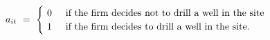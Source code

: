\begin{equation}
    a_{it} \ = \ 
    \begin{cases}
        \ 0 \hspace{0.5cm} \text{if the firm decides not to drill a well in the site} \\
        \ 1 \hspace{0.5cm} \text{if the firm decides to drill a well in the site.}
    \end{cases}
\label{Equation:DCDP-Model_Control-Variable}
\end{equation}